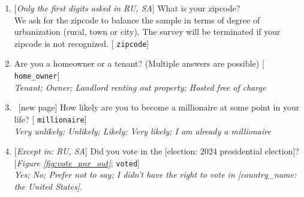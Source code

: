 \begin{enumerate}[resume]
\item  \label{q:zipcode} [\textit{Only the first digits asked in RU, SA}] What is your zipcode?\\
We ask for the zipcode to balance the sample in terms of degree of urbanization (rural, town or city). The survey will be terminated if your zipcode is not recognized. [%
\verb|zipcode|]


\item  \label{q:home} Are you a homeowner or a tenant? (Multiple answers are possible) [%
\verb|home_owner|]
  \\ \textit{Tenant; Owner; Landlord renting out property; Hosted free of charge}

\item ~[new page] \label{q:millionaire} How likely are you to become a millionaire at some point in your life? [%
\verb|millionaire|]
  \\ \textit{Very unlikely; Unlikely; Likely; Very likely; I am already a millionaire}%

\item  \label{q:voted} [\textit{Except in: RU, SA}] Did you vote in the [election: 2024 presidential election]? [\textit{Figure%
\ref{fig:vote_pnr_out}}; 
\verb|voted|]
  \\ \textit{Yes; No; Prefer not to say; I didn't have the right to vote in [country\_name: the United States].}

\end{enumerate} 

